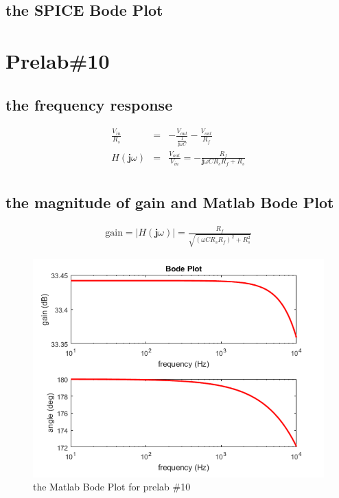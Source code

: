 \documentclass{IEEEtran}
\begin{document}
	\subsection{the SPICE Bode Plot}
	
	\section{\textbf{Prelab\#10}}
	\subsection{the frequency response}
	\begin{eqnarray*}
		\frac{V_{in}}{R_s} & = & -\frac{V_{out}}{\frac{1}{\mathbf{j}\omega C}} - \frac{V_{out}}{R_f}\\
		H(\mathbf{j}\omega) & = & \frac{V_{out}}{V_{in}} = -\frac{R_f}{\mathbf{j}\omega CR_sR_f + R_s}\\
	\end{eqnarray*}
	\subsection{the magnitude of gain and Matlab Bode Plot}
	\begin{eqnarray*}
		\mathrm{gain} = |H(\mathbf{j}\omega)| = \frac{R_f}{\sqrt{(\omega C R_s R_f)^2 + R_s^2}}
	\end{eqnarray*}
	\begin{figure}[!htbp]
		\centering
		\begin{framed}
			\includegraphics[width=\linewidth]{images/10.png}
			\caption{the Matlab Bode Plot for prelab \#10}
			\label{fig:1001}
		\end{framed}
	\end{figure}
\end{document}
